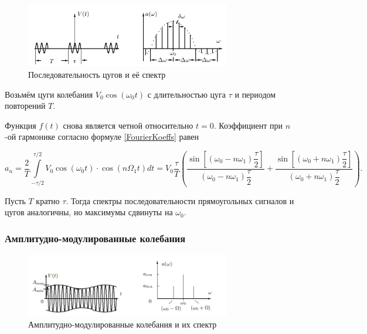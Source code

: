 \documentclass[a4paper,12pt]{article} %
\begin{document}
\begin{figure}[h]
    \centering
    \includegraphics[width=0.8\textwidth]{3.png} 
    \caption{Последовательность цугов и её спектр}
    \label{wavePackets}
\end{figure}

Возьмём цуги колебания $V_0 \cos(\omega_0 t)$ с длительностью цуга $\tau$ и периодом повторений $T$.

Функция $f(t)$ снова является четной относительно $t = 0$. Коэффициент при $n$-ой гармонике согласно формуле \eqref{FourierKoeffs} равен

\begin{equation}
    a_n = \dfrac{2}{T} \int\limits_{-\tau/2}^{\tau/2} V_0 \cos \left(\omega_0 t\right) \cdot \cos\left(n \Omega_1 t\right) dt = 
    V_0 \dfrac{\tau}{T} \left(\dfrac{\sin\left[\left(\omega_0 - n \omega_1\right) \dfrac{\tau}{2}\right]}{\left(\omega_0 - n\omega_1\right) \dfrac{\tau}{2}} + \dfrac{\sin\left[\left(\omega_0 + n\omega_1\right)\dfrac{\tau}{2}\right]}{\left(\omega_0 + n\omega_1\right) \dfrac{\tau}{2}}\right).
\end{equation}

Пусть $T$ кратно $\tau$. Тогда спектры последовательности прямоугольных сигналов и цугов аналогичны, но максимумы сдвинуты на $\omega_0$.

\subsubsection*{Амплитудно-модулированные колебания}

\begin{figure}[h]
    \centering
    \includegraphics[width=0.8\textwidth]{4.png} 
    \caption{Амплитудно-модулированные колебания и их спектр}
    \label{AMosc}
\end{figure}
\end{document}
